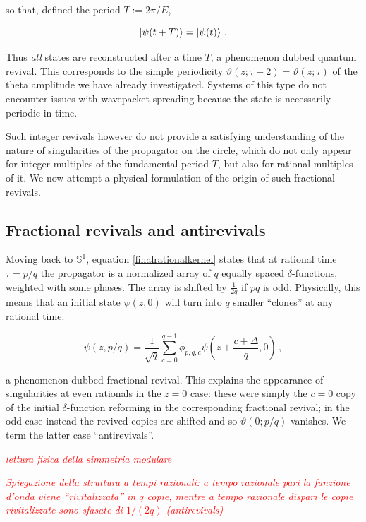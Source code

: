 \documentclass{article}
\newcommand{\T}{\ensuremath{\vartheta}}
\newcommand{\cmnt}[1]{\textcolor{red}{\emph{#1}}}
\begin{document}
so that, defined the period $T := 2\pi / E$,

\begin{equation}
    \ket{\psi(t+T)} = \ket{\psi(t)}\,.
\end{equation}

Thus \emph{all} states are reconstructed after a time $T$, a phenomenon dubbed quantum revival. This corresponds to the simple periodicity $\T(z;\tau+2) = \T(z;\tau)$ of the theta amplitude we have already investigated. Systems of this type do not encounter issues with wavepacket spreading because the state is necessarily periodic in time.

Such integer revivals however do not provide a satisfying understanding of the nature of singularities of the propagator on the circle, which do not only appear for integer multiples of the fundamental period $T$, but also for rational multiples of it. We now attempt a physical formulation of the origin of such fractional revivals.

\subsection{Fractional revivals and antirevivals}

Moving back to $\mathbb{S}^1$, equation \eqref{finalrationalkernel} states that at rational time $\tau = p/q$ the propagator is a normalized array of $q$ equally spaced $\delta$-functions, weighted with some phases. The array is shifted by $\frac{1}{2q}$ if $pq$ is odd. Physically, this means that an initial state $\psi(z,0)$ will turn into $q$ smaller ``clones'' at any rational time:

\begin{equation}
    \psi(z,p/q) = \frac{1}{\sqrt q} \sum_{c=0}^{q-1} \phi_{p,q,c} \psi(z + \frac{c+\Delta}{q},0)\,,
\end{equation}

a phenomenon dubbed fractional revival. This explains the appearance of singularities at even rationals in the $z=0$ case: these were simply the $c=0$ copy of the initial $\delta$-function reforming in the corresponding fractional revival; in the odd case instead the revived copies are shifted and so $\T(0;p/q)$ vanishes. We term the latter case ``antirevivals''.

\cmnt{lettura fisica della simmetria modulare}

\cmnt{Spiegazione della struttura a tempi razionali: a tempo razionale pari la funzione d'onda viene ``rivitalizzata'' in $q$ copie, mentre a tempo razionale dispari le copie rivitalizzate sono sfasate di $1/(2q)$ (antirevivals)}
\end{document}
